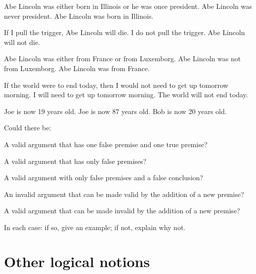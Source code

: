 \begin{practiceproblems}
\begin{earg}
\prem Abe Lincoln was either born in Illinois or he was once president.
\prem Abe Lincoln was never president.
\conc Abe Lincoln was born in Illinois.
\end{earg}

\begin{earg}
\prem If I pull the trigger, Abe Lincoln will die.
\prem I do not pull the trigger.
\conc Abe Lincoln will not die.
\end{earg}

\begin{earg}
\prem Abe Lincoln was either from France or from Luxemborg.
\prem Abe Lincoln was not from Luxemborg.
\conc Abe Lincoln was from France.
\end{earg}

\begin{earg}
\prem If the world were to end today, then I would not need to get up tomorrow morning.
\prem I will need to get up tomorrow morning.
\conc The world will not end today.
\end{earg}

\begin{earg}
\prem Joe is now 19 years old.
\prem Joe is now 87 years old.
\conc Bob is now 20 years old.
\end{earg}

\problempart
\label{pr.EnglishCombinations}
Could there be:
	\begin{earg}
		\item A valid argument that has one false premise and one true premise?
		\item A valid argument that has only false premises?
		\item A valid argument with only false premises and a false conclusion?
		\item An invalid argument that can be made valid by the addition of a new premise?
		\item A valid argument that can be made invalid by the addition of a new premise?
	\end{earg}
In each case: if so, give an example; if not, explain why not.

\medskip

\todo{!!!}
\end{practiceproblems}


\chapter{Other logical notions}\label{s:BasicNotions}

